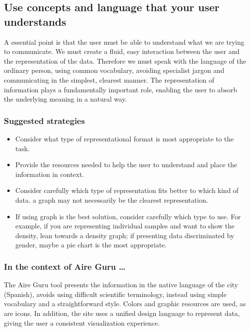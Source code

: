 \subsection{Use concepts and language that your user understands}

A essential point is that the user must be able to understand what we are trying to communicate. We must create a fluid, 
easy interaction between the user and the representation of the data. Therefore we must speak with the language of 
the ordinary person, using common vocabulary, avoiding specialist jargon and communicating in the simplest, 
clearest manner. The representation of information plays a fundamentally important role, enabling the user to absorb 
the underlying meaning in a natural way.\\

\subsubsection*{Suggested strategies} 

\begin{itemize}
    \item Consider what type of representational format is most appropriate to the task.
    
    \item Provide the resources needed to help the user to understand and place the information in context.

    \item Consider carefully which type of representation fits better to which kind of data. a graph may not necessarily be the clearest representation.

    \item If using graph is the best solution, consider carefully which type to use. For example, 
    if you are representing individual samples and want to show the density, lean towards a density graph; if presenting data discriminated by gender,
    maybe a pie chart is the most appropriate.
\end{itemize}

\subsubsection*{In the context of Aire Guru \ldots} 

The Aire Guru tool presents the information in the native language of the city (Spanish), avoids using difficult scientific terminology, instead using simple vocabulary and a 
straightforward style. Colors and graphic resources are used, as are icons. In addition, the site uses a unified design language to represent data,
giving the user a consistent visualization experience. \\

